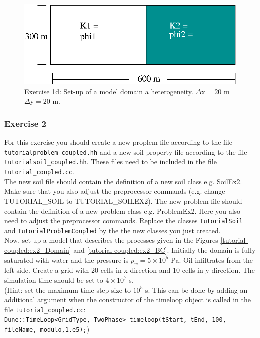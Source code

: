 \begin{enumerate}
\begin{figure}[h]
\centering
\includegraphics[width=0.5\linewidth,keepaspectratio]{EPS/exercise1_c.eps}
\caption{Exercise 1d: Set-up of a model domain a heterogeneity. $\Delta \text{x} = 20$ m $\Delta \text{y} = 20$ m.}\label{tutorial-coupled:exercise1_d}
\end{figure}

\end{enumerate}

\subsubsection{Exercise 2}
For this exercise you should create a new proplem file according to the file \texttt{tutorialproblem\_coupled.hh} and a new soil property file according to the file \texttt{tutorialsoil\_coupled.hh}. These files need to be included in the file \texttt{tutorial\_coupled.cc}.\\
The new soil file should contain the definition of a new soil class e.g. SoilEx2. Make sure that you also adjust the preprocessor commands (e.g. change TUTORIAL\_SOIL to TUTORIAL\_SOILEX2). 
The new problem file should contain the definition of a new problem class e.g. ProblemEx2. Here you also need to adjust the preprocessor commands. 
Replace the classes \texttt{TutorialSoil} and \texttt{TutorialProblemCoupled} by the the new classes you just created. \\
Now, set up a model that describes the processes given in the Figures \ref{tutorial-coupled:ex2_Domain} and \ref{tutorial-coupled:ex2_BC}. Initially the domain is fully
saturated with water and the pressure is $p_w = 5 \times 10^5$ Pa. Oil infiltrates from the left side. Create a grid with 20 cells in x direction and 10 cells in y direction. The simulation time should be set to $4\times 10^7$ s.\\
 (Hint: set the maximum time step size to $10^5$ s. This can be done by adding an additional argument when the constructor of the timeloop object is called in the file \texttt{tutorial\_coupled.cc}: \\
\texttt{Dune::TimeLoop<GridType, TwoPhase> timeloop(tStart, tEnd, 100, fileName, modulo,1.e5);})

